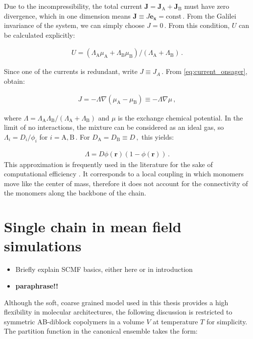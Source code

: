 \documentclass[bachelor,       %
               twoside,        %
               BCOR10mm,       %
               ngerman, english %
               ]{GAUBM}
\begin{document}
Due to the incompressibility, the total current $\mathbf J=\mathbf{J}_\mathrm A+\mathbf{J}_\mathrm B$ must have zero divergence, which in one dimension means $\mathbf J\equiv J\mathbf{e_x}=\mathrm{const}\,.$ From the Galilei invariance of the system, we can simply choose $J=0\,.$ From this condition, $U$ can be calculated explicitly:

\begin{align}
  U=(\Lambda_\mathrm A\mu_\mathrm A+\Lambda_\mathrm B\mu_\mathrm B)/(\Lambda_\mathrm A+\Lambda_\mathrm B)\,.
\end{align}

Since one of the currents is redundant, write $J\equiv J_A\,.$ From \eqref{eq:current_onsager}, obtain:

\begin{align}
  J=-\Lambda\nabla(\mu_\mathrm A - \mu_\mathrm B)\equiv -\Lambda\nabla\mu\,,
\end{align}

where $\Lambda=\Lambda_\mathrm A\Lambda_\mathrm B/(\Lambda_\mathrm A+\Lambda_\mathrm B)$ and $\mu$ is the exchange chemical potential. In the limit of no interactions, the mixture can be considered as an ideal gas, so $\Lambda_i=D_i/\phi_i$ for $i=\mathrm A, \mathrm B\,.$ For $D_\mathrm A=D_\mathrm B\equiv D\,,$ this yields:

\begin{align}
  \Lambda=D\phi(\mathbf{r})(1-\phi(\mathbf{r}))\,.
  \label{eq:onsager}
\end{align}
This approximation is frequently used in the literature for the sake of computational efficiency \cite{Fraaje97,deGennes80,Binder83}. It corresponds to a local coupling in which monomers move like the center of mass, therefore it does not account for the connectivity of the monomers along the backbone of the chain. 

\section{Single chain in mean field simulations}

\begin{itemize}
    \item Briefly explain SCMF basics, either here or in introduction
    \item \textbf{paraphrase!!}
\end{itemize}



Although the soft, coarse grained model used in this thesis provides a high flexibility in molecular architectures, the following discussion is restricted to symmetric  AB-diblock copolymers in a volume $V$ at temperature $T$ for simplicity. The partition function in the canonical ensemble takes the form:
\end{document}
